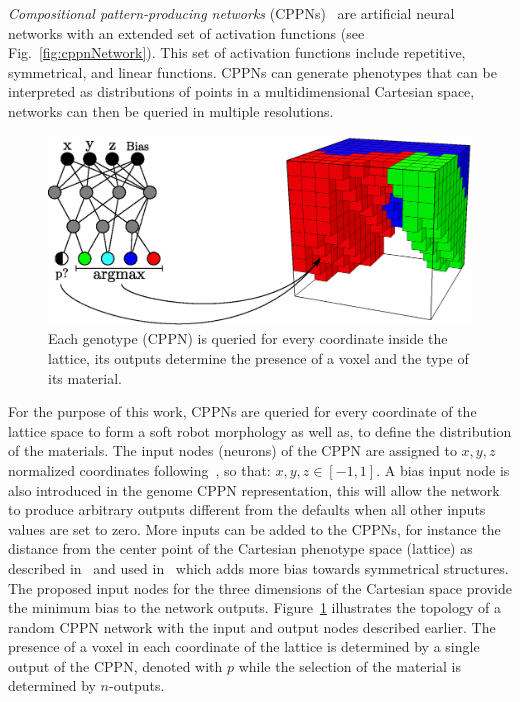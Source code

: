 \documentclass{sig-alternate}
\begin{document}
\emph{Compositional pattern-producing networks} (CPPNs)~\cite{stanley2007compositional} are artificial neural networks with an extended set of activation functions (see Fig.~\ref{fig:cppnNetwork}). This set of activation functions include repetitive, symmetrical, and linear functions. CPPNs can generate phenotypes that can be interpreted as distributions of points in a multidimensional Cartesian space, networks can then be queried in multiple resolutions.

\begin{figure}[t!]
\centering
\includegraphics[width=0.35\textheight]{../Figures/Misc/cppnSoftBot.eps}
\caption{Each genotype (CPPN) is queried for every coordinate inside the lattice, its outputs determine the presence of a voxel and the type of its material.}
\label{fig:cppnDiagram}
\end{figure}

For the purpose of this work, CPPNs are queried for every coordinate of the lattice space to form a soft robot morphology as well as, to define the distribution of the materials. The input nodes (neurons) of the CPPN are assigned to $x,y,z$ normalized coordinates following~\cite{cheney2013unshackling}, so that:
$x,y,z \in [-1,1]$.
A bias input node is also introduced in the genome CPPN representation, this will allow the network to produce arbitrary outputs different from the defaults when all other inputs values are set to zero. More inputs can be added to the CPPNs, for instance the distance from the center point of the Cartesian phenotype space (lattice) as described in~\cite{stanley2007compositional} and used in~\cite{cheney2013unshackling} which adds more bias towards symmetrical structures. The proposed input nodes for the three dimensions of the Cartesian space provide the minimum bias to the network outputs. Figure~\ref{fig:cppnDiagram} illustrates the topology of a random CPPN network with the input and output nodes  described earlier. The presence of a voxel in each coordinate of the lattice is determined by a single output of the CPPN, denoted with $p$ while the selection of the material is determined by $n$-outputs.
\end{document}
